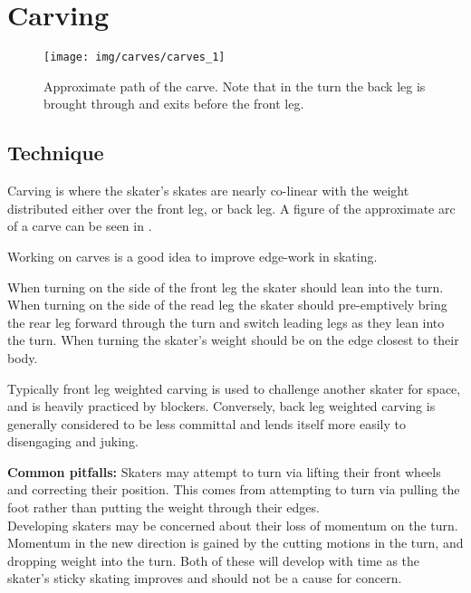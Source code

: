 \section{Carving}
\label{sec:sticky/carves}


\begin{figure}
\centering
\texttt{[image: img/carves/carves\_1]}
\caption{Approximate path of the carve. Note that in the turn the back leg is brought through and exits before the front leg. \label{fig:carves}}
\end{figure}

\subsection*{Technique}

Carving is where the skater's skates are nearly co-linear with the weight distributed either over the front leg, or back leg.
A figure of the approximate arc of a carve can be seen in .


Working on carves is a good idea to improve edge-work in skating.  


When turning on the side of the front leg the skater should lean into the turn.  
When turning on the side of the read leg the skater should pre-emptively bring the rear leg forward through the turn and switch leading legs as they lean into the turn.  
When turning the skater's weight should be on the edge closest to their body.   


Typically front leg weighted carving is used to challenge another skater for space, and is heavily practiced by blockers.     
Conversely, back leg weighted carving is generally considered to be less committal and lends itself more easily to disengaging and juking.


{\bf Common pitfalls:}
Skaters may attempt to turn via lifting their front wheels and correcting their position.
This comes from attempting to turn via pulling the foot rather than putting the weight through their edges. \\ 



Developing skaters may be concerned about their loss of momentum on the turn. 
Momentum in the new direction is gained by the cutting motions in the turn, and dropping weight into the turn.   
Both of these will develop with time as the skater's sticky skating improves and should not be a cause for concern. \\ 



